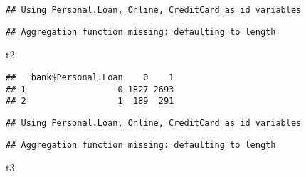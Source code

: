 \documentclass[
]{article}
\newenvironment{Shaded}{\begin{snugshade}}{\end{snugshade}}
\newcommand{\FunctionTok}[1]{\textcolor[rgb]{0.00,0.00,0.00}{#1}}
\newcommand{\NormalTok}[1]{#1}
\newcommand{\OtherTok}[1]{\textcolor[rgb]{0.56,0.35,0.01}{#1}}
\newcommand{\SpecialCharTok}[1]{\textcolor[rgb]{0.00,0.00,0.00}{#1}}
\begin{document}
\begin{Shaded}
\end{Shaded}

\begin{verbatim}
## Using Personal.Loan, Online, CreditCard as id variables
\end{verbatim}

\begin{verbatim}
## Aggregation function missing: defaulting to length
\end{verbatim}

\begin{Shaded}
\begin{Highlighting}[]
\NormalTok{t2}
\end{Highlighting}
\end{Shaded}

\begin{verbatim}
##   bank$Personal.Loan    0    1
## 1                  0 1827 2693
## 2                  1  189  291
\end{verbatim}

\begin{Shaded}
\end{Shaded}

\begin{verbatim}
## Using Personal.Loan, Online, CreditCard as id variables
\end{verbatim}

\begin{verbatim}
## Aggregation function missing: defaulting to length
\end{verbatim}

\begin{Shaded}
\begin{Highlighting}[]
\NormalTok{t3}
\end{Highlighting}
\end{Shaded}
\end{document}
